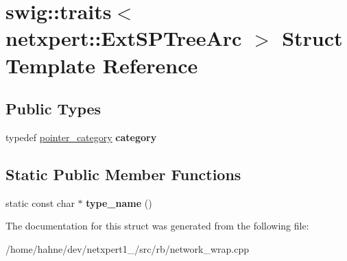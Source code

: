 \hypertarget{structswig_1_1traits_3_01netxpert_1_1ExtSPTreeArc_01_4}{}\section{swig\+:\+:traits$<$ netxpert\+:\+:Ext\+S\+P\+Tree\+Arc $>$ Struct Template Reference}
\label{structswig_1_1traits_3_01netxpert_1_1ExtSPTreeArc_01_4}
\subsection*{Public Types}
\begin{DoxyCompactItemize}
\item 
typedef \hyperlink{structswig_1_1pointer__category}{pointer\+\_\+category} {\bfseries category}\hypertarget{structswig_1_1traits_3_01netxpert_1_1ExtSPTreeArc_01_4_afeacf9fb2526a8f7e7f757c942625e90}{}\label{structswig_1_1traits_3_01netxpert_1_1ExtSPTreeArc_01_4_afeacf9fb2526a8f7e7f757c942625e90}

\end{DoxyCompactItemize}
\subsection*{Static Public Member Functions}
\begin{DoxyCompactItemize}
\item 
static const char $\ast$ {\bfseries type\+\_\+name} ()\hypertarget{structswig_1_1traits_3_01netxpert_1_1ExtSPTreeArc_01_4_a7c8b7fb22226d0bb8401eff50e18a635}{}\label{structswig_1_1traits_3_01netxpert_1_1ExtSPTreeArc_01_4_a7c8b7fb22226d0bb8401eff50e18a635}

\end{DoxyCompactItemize}


The documentation for this struct was generated from the following file\+:\begin{DoxyCompactItemize}
\item 
/home/hahne/dev/netxpert1\+\_/src/rb/network\+\_\+wrap.\+cpp\end{DoxyCompactItemize}

